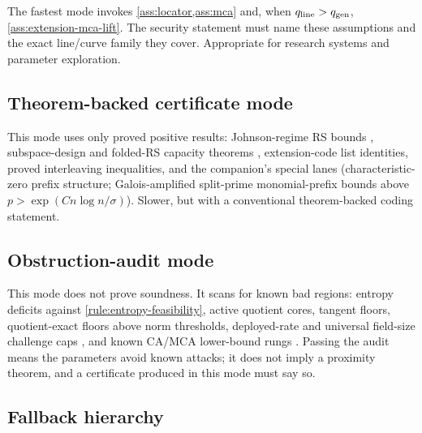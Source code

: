 \documentclass[11pt]{article}
\theoremstyle{definition}
\newcommand{\qgen}{q_{\rm gen}}
\newcommand{\qline}{q_{\rm line}}
\begin{document}
The fastest mode invokes \cref{ass:locator,ass:mca} and, when $\qline>\qgen$, \cref{ass:extension-mca-lift}.  The security statement must name these assumptions and the exact line/curve family they cover.  Appropriate for research systems and parameter exploration.

\subsection{Theorem-backed certificate mode}

This mode uses only proved positive results: Johnson-regime RS bounds \cite{BCIKS20,BCHKS25}, subspace-design and folded-RS capacity theorems \cite{CZ25,GG25}, extension-code list identities, proved interleaving inequalities, and the companion's special lanes \cite[Cor.~4.3, Cor.~5.3]{SlackMCAEntropyMerged} (characteristic-zero prefix structure; Galois-amplified split-prime monomial-prefix bounds above $p>\exp(Cn\log n/\sigma)$).  Slower, but with a conventional theorem-backed coding statement.

\subsection{Obstruction-audit mode}

This mode does not prove soundness.  It scans for known bad regions: entropy deficits against \cref{rule:entropy-feasibility}, active quotient cores, tangent floors, quotient-exact floors above norm thresholds, deployed-rate and universal field-size challenge caps \cite{UniversalCap}, and known CA/MCA lower-bound rungs \cite{NoSlack,SlackMCAEntropyMerged}.  Passing the audit means the parameters avoid known attacks; it does not imply a proximity theorem, and a certificate produced in this mode must say so.

\subsection{Fallback hierarchy}
\end{document}
